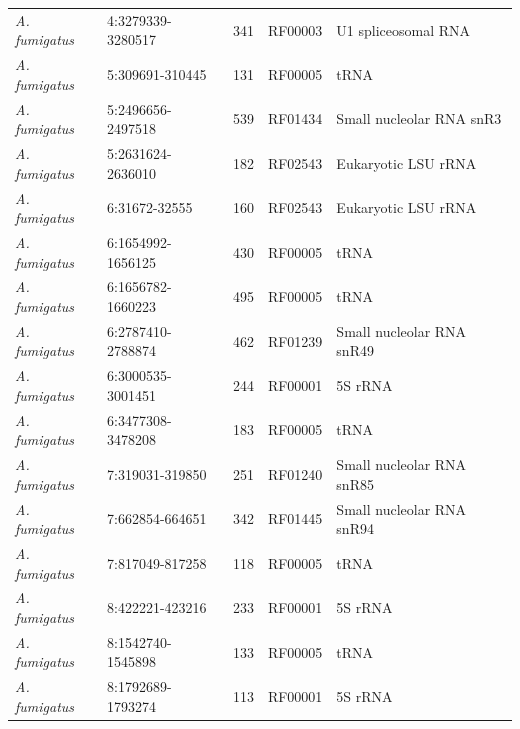 \documentclass[12pt]{report}
\begin{document}
\begin{table}[H]
\begin{tabular}{|l|l|c|c|l|}
    \textit{A. fumigatus} & 4:3279339-3280517 & 341 & RF00003 & U1 spliceosomal RNA\\
    \textit{A. fumigatus} & 5:309691-310445 & 131 & RF00005 & tRNA\\
    \textit{A. fumigatus} & 5:2496656-2497518 & 539 & RF01434 & Small nucleolar RNA snR3\\
    \textit{A. fumigatus} & 5:2631624-2636010 & 182 & RF02543 & Eukaryotic LSU rRNA\\
    \textit{A. fumigatus} & 6:31672-32555 & 160 & RF02543 & Eukaryotic LSU rRNA\\
    \textit{A. fumigatus} & 6:1654992-1656125 & 430 & RF00005 & tRNA\\
    \textit{A. fumigatus} & 6:1656782-1660223 & 495 & RF00005 & tRNA\\
    \textit{A. fumigatus} & 6:2787410-2788874 & 462 & RF01239 & Small nucleolar RNA snR49\\
    \textit{A. fumigatus} & 6:3000535-3001451 & 244 & RF00001 & 5S rRNA\\
    \textit{A. fumigatus} & 6:3477308-3478208 & 183 & RF00005 & tRNA\\
    \textit{A. fumigatus} & 7:319031-319850 & 251 & RF01240 & Small nucleolar RNA snR85\\
    \textit{A. fumigatus} & 7:662854-664651 & 342 & RF01445 & Small nucleolar RNA snR94\\
    \textit{A. fumigatus} & 7:817049-817258 & 118 & RF00005 & tRNA\\
    \textit{A. fumigatus} & 8:422221-423216 & 233 & RF00001 & 5S rRNA\\
    \textit{A. fumigatus} & 8:1542740-1545898 & 133 & RF00005 & tRNA\\
    \textit{A. fumigatus} & 8:1792689-1793274 & 113 & RF00001 & 5S rRNA\\
    \hline
  \end{tabular}


  \bigbreak
  

\end{table}
\end{document}
